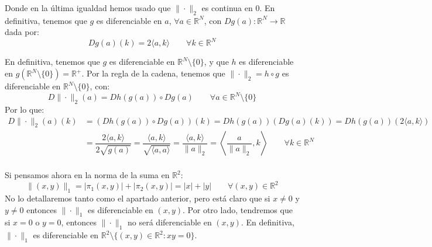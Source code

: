 \begin{ejercicio}
\begin{description}
        Donde en la última igualdad hemos usado que $\|\cdot\|_2$ es continua en $0$. En definitiva, tenemos que $g$ es diferenciable en $a$, $\forall a\in \mathbb{R}^N$, con $Dg(a):\mathbb{R}^N\to \mathbb{R}$ dada por:
        \begin{equation*}
            Dg(a)(k) = 2\langle a,k \rangle  \qquad \forall k\in \mathbb{R}^N
        \end{equation*}
\end{description}
En definitiva, tenemos que $g$ es diferenciable en $\mathbb{R}^N\setminus \{0\}$, y que $h$ es diferenciable en $g(\mathbb{R}^N\setminus \{0\}) = \mathbb{R}^+$. Por la regla de la cadena, tenemos que $\|\cdot\|_2 = h\circ g$ es diferenciable en $\mathbb{R}^N\setminus\{0\}$, con:
\begin{equation*}
    D\|\cdot\|_2(a) = Dh(g(a)) \circ Dg(a) \qquad \forall a\in \mathbb{R}^N\setminus\{0\}
\end{equation*}
Por lo que:
\begin{align*}
    D\|\cdot\|_2(a)(k) &= \left(Dh(g(a)) \circ Dg(a)\right)(k) = Dh(g(a))\left(Dg(a)(k)\right) = Dh(g(a))(2\langle a,k \rangle ) \\
    &= \dfrac{2\langle a,k \rangle }{2\sqrt{g(a)}} = \dfrac{\langle a,k \rangle }{\sqrt{\langle a,a \rangle }} = \dfrac{\langle a,k \rangle }{\|a\|_2} = \left\langle \dfrac{a}{\|a\|_2},k \right\rangle \qquad \forall k\in \mathbb{R}^N
\end{align*}~\\

\noindent
Si pensamos ahora en la norma de la suma en $\mathbb{R}^2$:
\begin{equation*}
    \|(x,y)\|_1 = |\pi_1(x,y)| + |\pi_2(x,y)| = |x| + |y| \qquad \forall (x,y)\in \mathbb{R}^2
\end{equation*}
No lo detallaremos tanto como el apartado anterior, pero está claro que si $x\neq 0$ y $y \neq 0$ entonces $\|\cdot\|_1$ es diferenciable en $(x,y)$. Por otro lado, tendremos que si $x = 0$ o $y = 0$, entonces $\|\cdot\|_1$ no será diferenciable en $(x,y)$. En definitiva, $\|\cdot\|_1$ es diferenciable en $\mathbb{R}^2 \setminus \{(x,y) \in \mathbb{R}^2 : xy = 0\}$.
\end{ejercicio}

